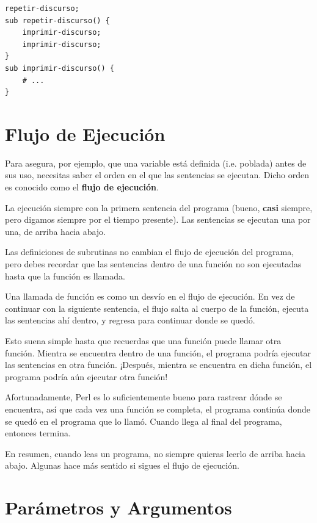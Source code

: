 \begin{verbatim}
repetir-discurso;
sub repetir-discurso() {
    imprimir-discurso;
    imprimir-discurso;
}
sub imprimir-discurso() {
    # ...
}
\end{verbatim}


\section{Flujo de Ejecución}

Para asegura, por ejemplo, que una variable está definida (i.e. poblada)
antes de sus uso, necesitas saber el orden en el que las sentencias se
ejecutan. Dicho orden es conocido como el {\bf flujo de ejecución}.

La ejecución siempre con la primera sentencia del programa (bueno, {\bf casi}
siempre, pero digamos siempre por el tiempo presente). Las sentencias se
ejecutan una por una, de arriba hacia abajo.

Las definiciones de subrutinas no cambian el flujo de ejecución del 
programa, pero debes recordar que las sentencias dentro de una función
no son ejecutadas hasta que la función es llamada.

Una llamada de función es como un desvío en el flujo de ejecución. En vez
de continuar con la siguiente sentencia, el flujo salta al cuerpo de la función,
ejecuta las sentencias ahí dentro, y regresa para continuar donde se
quedó.

Esto suena simple hasta que recuerdas que una función puede llamar otra función.
Mientra se encuentra dentro de una función, el programa podría ejecutar las
sentencias en otra función. ¡Después, mientra se encuentra en dicha función,
el programa podría aún ejecutar otra función!

Afortunadamente, Perl es lo suficientemente bueno para rastrear dónde 
se encuentra, así que cada vez una función se completa, el programa continúa 
donde se quedó en el programa que lo llamó. Cuando llega al final del programa,
entonces termina.

En resumen, cuando leas un programa, no siempre quieras leerlo de 
arriba hacia abajo. Algunas hace más sentido si sigues el flujo de
ejecución.

\section{Parámetros y Argumentos}
\label{parameters}


